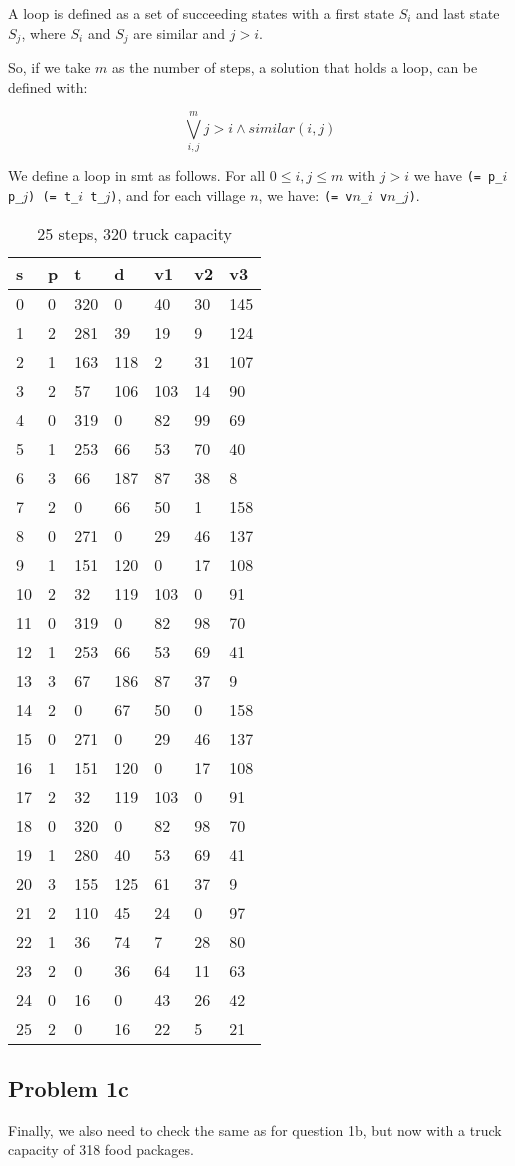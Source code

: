 \documentclass[a4paper]{article}
\begin{document}
	A loop is defined as a set of succeeding states with a first state $S_i$ and last state $S_j$, where $S_i$ and $S_j$ are similar and $j > i$.
	
	So, if we take $m$ as the number of steps, a solution that holds a loop, can be defined with:
	
	$$\bigvee_{i, j}^m j > i \wedge similar(i, j)$$
	
	We define a loop in smt as follows. For all $0 \leq i, j \leq m$ with $j > i$ we have {\tt (= p\_$i$ p\_$j$) (= t\_$i$ t\_$j$)}, and for each village $n$, we have: {\tt (= v$n$\_$i$ v$n$\_$j$)}.
	
	\begin{longtable}[c]{@{}|l|l|l|l|l|l|l|@{}}
		\caption{25 steps, 320 truck capacity}\\
		\toprule
		s & p & t & d & v1 & v2 & v3\tabularnewline
		\midrule
		\endhead
		0 & 0 & 320 & 0 & 40 & 30 & 145\tabularnewline
		1 & 2 & 281 & 39 & 19 & 9 & 124\tabularnewline
		2 & 1 & 163 & 118 & 2 & 31 & 107\tabularnewline
		3 & 2 & 57 & 106 & 103 & 14 & 90\tabularnewline
		4 & 0 & 319 & 0 & 82 & 99 & 69\tabularnewline
		5 & 1 & 253 & 66 & 53 & 70 & 40\tabularnewline
		6 & 3 & 66 & 187 & 87 & 38 & 8\tabularnewline
		7 & 2 & 0 & 66 & 50 & 1 & 158\tabularnewline
		8 & 0 & 271 & 0 & 29 & 46 & 137\tabularnewline
		9 & 1 & 151 & 120 & 0 & 17 & 108\tabularnewline
		10 & 2 & 32 & 119 & 103 & 0 & 91\tabularnewline
		11 & 0 & 319 & 0 & 82 & 98 & 70\tabularnewline
		12 & 1 & 253 & 66 & 53 & 69 & 41\tabularnewline
		13 & 3 & 67 & 186 & 87 & 37 & 9\tabularnewline
		14 & 2 & 0 & 67 & 50 & 0 & 158\tabularnewline
		15 & 0 & 271 & 0 & 29 & 46 & 137\tabularnewline
		16 & 1 & 151 & 120 & 0 & 17 & 108\tabularnewline
		17 & 2 & 32 & 119 & 103 & 0 & 91\tabularnewline
		18 & 0 & 320 & 0 & 82 & 98 & 70\tabularnewline
		19 & 1 & 280 & 40 & 53 & 69 & 41\tabularnewline
		20 & 3 & 155 & 125 & 61 & 37 & 9\tabularnewline
		21 & 2 & 110 & 45 & 24 & 0 & 97\tabularnewline
		22 & 1 & 36 & 74 & 7 & 28 & 80\tabularnewline
		23 & 2 & 0 & 36 & 64 & 11 & 63\tabularnewline
		24 & 0 & 16 & 0 & 43 & 26 & 42\tabularnewline
		25 & 2 & 0 & 16 & 22 & 5 & 21\tabularnewline
		\bottomrule
	\end{longtable}
	
	
	\subsection*{Problem 1c}
	Finally, we also need to check the same as for question 1b, but now with a truck capacity of 318 food packages.
	
\end{document}
